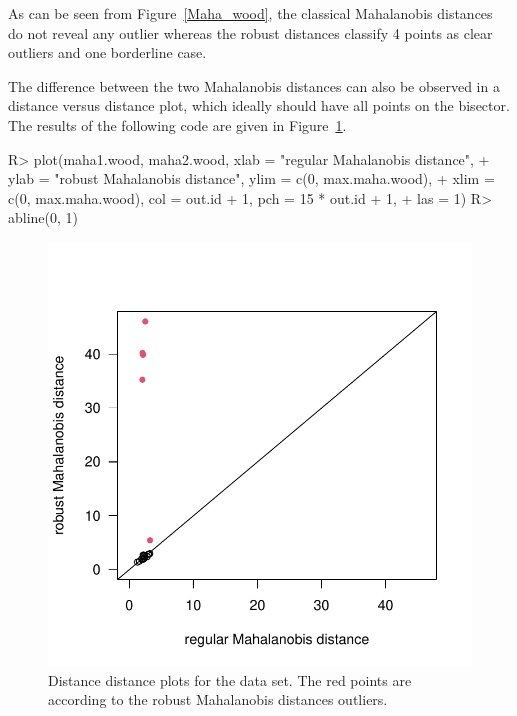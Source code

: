 \documentclass[article,nojss]{jss}
\begin{document}
As can be seen from Figure~\ref{Maha_wood}, the classical Mahalanobis distances do not
reveal any outlier whereas the robust distances classify 4 points as clear outliers
and one borderline case.

The difference between the two Mahalanobis distances can also be observed in a distance versus distance plot, which ideally should
have all points on the bisector. The results of the following code are given in Figure~\ref{Dist_Dist_wood}.
\begin{Schunk}
\begin{Sinput}
R> plot(maha1.wood, maha2.wood, xlab = "regular Mahalanobis distance",
+    ylab = "robust Mahalanobis distance", ylim = c(0, max.maha.wood),
+    xlim = c(0, max.maha.wood), col = out.id + 1, pch = 15 * out.id + 1,
+    las = 1)
R> abline(0, 1)
\end{Sinput}
\end{Schunk}

\begin{figure}[t]
\begin{center}
\includegraphics{ICS-011}
\caption{Distance distance plots for the  data set. The red points are according to the robust Mahalanobis distances outliers.}
\label{Dist_Dist_wood}
\end{center}
\end{figure}
\end{document}
